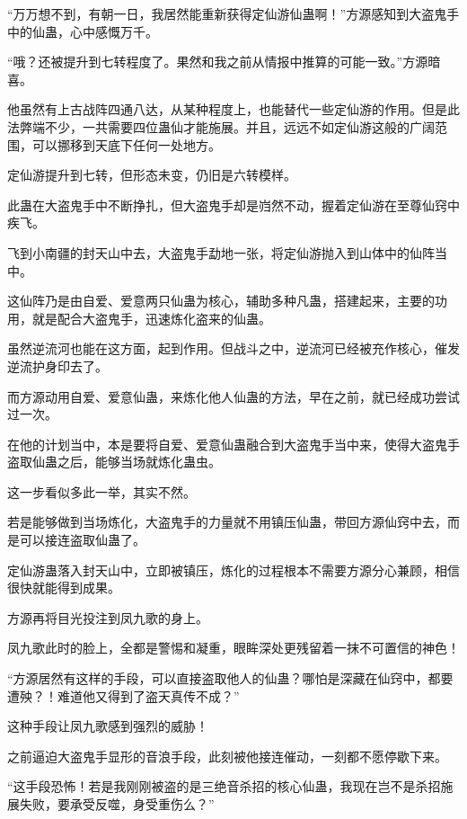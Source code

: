 
\begin{this_body}

“万万想不到，有朝一日，我居然能重新获得定仙游仙蛊啊！”方源感知到大盗鬼手中的仙蛊，心中感慨万千。

“哦？还被提升到七转程度了。果然和我之前从情报中推算的可能一致。”方源暗喜。

他虽然有上古战阵四通八达，从某种程度上，也能替代一些定仙游的作用。但是此法弊端不少，一共需要四位蛊仙才能施展。并且，远远不如定仙游这般的广阔范围，可以挪移到天底下任何一处地方。

定仙游提升到七转，但形态未变，仍旧是六转模样。

此蛊在大盗鬼手中不断挣扎，但大盗鬼手却是岿然不动，握着定仙游在至尊仙窍中疾飞。

飞到小南疆的封天山中去，大盗鬼手勐地一张，将定仙游抛入到山体中的仙阵当中。

这仙阵乃是由自爱、爱意两只仙蛊为核心，辅助多种凡蛊，搭建起来，主要的功用，就是配合大盗鬼手，迅速炼化盗来的仙蛊。

虽然逆流河也能在这方面，起到作用。但战斗之中，逆流河已经被充作核心，催发逆流护身印去了。

而方源动用自爱、爱意仙蛊，来炼化他人仙蛊的方法，早在之前，就已经成功尝试过一次。

在他的计划当中，本是要将自爱、爱意仙蛊融合到大盗鬼手当中来，使得大盗鬼手盗取仙蛊之后，能够当场就炼化蛊虫。

这一步看似多此一举，其实不然。

若是能够做到当场炼化，大盗鬼手的力量就不用镇压仙蛊，带回方源仙窍中去，而是可以接连盗取仙蛊了。

定仙游蛊落入封天山中，立即被镇压，炼化的过程根本不需要方源分心兼顾，相信很快就能得到成果。

方源再将目光投注到凤九歌的身上。

凤九歌此时的脸上，全都是警惕和凝重，眼眸深处更残留着一抹不可置信的神色！

“方源居然有这样的手段，可以直接盗取他人的仙蛊？哪怕是深藏在仙窍中，都要遭殃？！难道他又得到了盗天真传不成？”

这种手段让凤九歌感到强烈的威胁！

之前逼迫大盗鬼手显形的音浪手段，此刻被他接连催动，一刻都不愿停歇下来。

“这手段恐怖！若是我刚刚被盗的是三绝音杀招的核心仙蛊，我现在岂不是杀招施展失败，要承受反噬，身受重伤么？”


\end{this_body}
